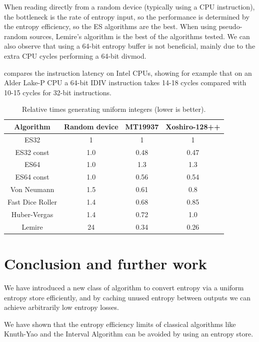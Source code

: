 \documentclass[12pt]{article}
\begin{document}
When reading directly from a random device (typically using a CPU instruction), the bottleneck is the rate of entropy input, so the performance is determined by the entropy efficiency, so the ES algorithms are the best. When using pseudo-random sources, Lemire's algorithm is the best of the algorithms tested. We can also observe that using a 64-bit entropy buffer is not beneficial, mainly due to the extra CPU cycles performing a 64-bit divmod.

\cite{Abel19a} compares the instruction latency on Intel CPUs, showing for example that on an Alder Lake-P CPU a 64-bit IDIV instruction takes 14-18 cycles compared with 10-15 cycles for 32-bit instructions.


\begin{table}[h!]
\centering
\begin{tabular}{|c|c|c|c|}
\hline
Algorithm & Random device & MT19937 & Xoshiro-128++ \\
\hline
ES32 & 1 & 1 & 1 \\
ES32 const & 1.0 & 0.48 & 0.47 \\
ES64 & 1.0 & 1.3 & 1.3 \\
ES64 const & 1.0 & 0.56 & 0.54 \\
Von Neumann \cite{neumann51} & 1.5 & 0.61 & 0.8 \\
Fast Dice Roller \cite{lumbroso2013optimal} & 1.4 & 0.68 & 0.85 \\
Huber-Vergas \cite{huber2024optimalrollingfairdice} & 1.4 & 0.72 & 1.0 \\
Lemire \cite{lemire2019fast} & 24 & 0.34 & 0.26 \\
\hline
\end{tabular}
\caption{Relative times generating uniform integers (lower is better).}
    \label{tab:speed}
\end{table}



\section{Conclusion and further work}

We have introduced a new class of algorithm to convert entropy via a uniform entropy store efficiently, and by caching unused entropy between outputs we can achieve arbitrarily low entropy losses.

We have shown that the entropy efficiency limits of classical algorithms like Knuth-Yao and the Interval Algorithm can be avoided by using an entropy store. 
\end{document}
